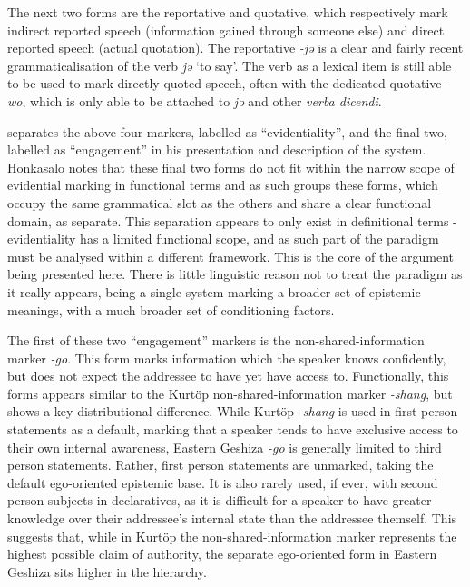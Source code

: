 The next two forms are the reportative and quotative, which respectively mark indirect reported speech (information gained through someone else) and direct reported speech (actual quotation). The reportative \textit{-jə} is a clear and fairly recent grammaticalisation of the verb \textit{jə} `to say'. The verb as a lexical item is still able to be used to mark directly quoted speech, often with the dedicated quotative \textit{-wo}, which is only able to be attached to \textit{jə} and other \textit{verba dicendi}.

 separates the above four markers, labelled as ``evidentiality'', and the final two, labelled as ``engagement'' in his presentation and description of the system. Honkasalo notes that these final two forms do not fit within the narrow scope of evidential marking in functional terms and as such groups these forms, which occupy the same grammatical slot as the others and share a clear functional domain, as separate. This separation appears to only exist in definitional terms - evidentiality has a limited functional scope, and as such part of the paradigm must be analysed within a different framework. This is the core of the argument being presented here. There is little linguistic reason not to treat the paradigm as it really appears, being a single system marking a broader set of epistemic meanings, with a much broader set of conditioning factors.

The first of these two ``engagement'' markers is the non-shared-information marker \textit{-go}. This form marks information which the speaker knows confidently, but does not expect the addressee to have yet have access to. Functionally, this forms appears similar to the Kurtöp non-shared-information marker \textit{-shang}, but shows a key distributional difference. While Kurtöp \textit{-shang} is used in first-person statements as a default, marking that a speaker tends to have exclusive access to their own internal awareness, Eastern Geshiza \textit{-go} is generally limited to third person statements. Rather, first person statements are unmarked, taking the default ego-oriented epistemic base. It is also rarely used, if ever, with second person subjects in declaratives, as it is difficult for a speaker to have greater knowledge over their addressee's internal state than the addressee themself. This suggests that, while in Kurtöp the non-shared-information marker represents the highest possible claim of authority, the separate ego-oriented form in Eastern Geshiza sits higher in the hierarchy.

